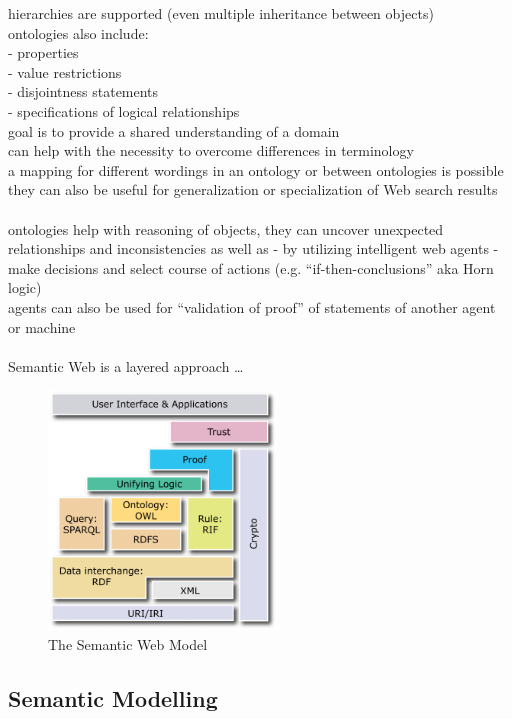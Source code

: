 hierarchies are supported (even multiple inheritance between objects) \\
ontologies also include: \\
- properties \\
- value restrictions \\
- disjointness statements \\
- specifications of logical relationships \\
goal is to provide a shared understanding of a domain \\
can help with the necessity to overcome differences in terminology \\
a mapping for different wordings in an ontology or between ontologies is possible \\
they can also be useful for generalization or specialization of Web search results \\
\\
ontologies help with reasoning of objects, they can uncover unexpected relationships and
inconsistencies as well as - by utilizing intelligent web agents - make decisions and select course of actions
(e.g. ``if-then-conclusions'' aka Horn logic) \\
agents can also be used for ``validation of proof'' of statements of another agent or machine \\
\\
Semantic Web is a layered approach \ldots

\begin{figure}[H]
	\centering
		\includegraphics[height=2.5in]{images/semantic_web_layers.png}
	\caption{The Semantic Web Model \citep{W3C2013}}
\label{fig:images_semweb_model}
\end{figure}


\subsection{Semantic Modelling}
\label{sec:semantic_models}

